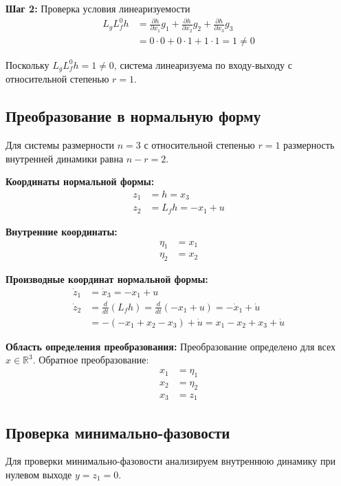 \textbf{Шаг 2:} Проверка условия линеаризуемости
\begin{align}
L_g L_f^0 h &= \frac{\partial h}{\partial x_1} g_1 + \frac{\partial h}{\partial x_2} g_2 + \frac{\partial h}{\partial x_3} g_3 \\
&= 0 \cdot 0 + 0 \cdot 1 + 1 \cdot 1 = 1 \neq 0
\end{align}

Поскольку $L_g L_f^0 h = 1 \neq 0$, система линеаризуема по входу-выходу с относительной степенью $r = 1$.

\subsection{Преобразование в нормальную форму}

Для системы размерности $n = 3$ с относительной степенью $r = 1$ размерность внутренней динамики равна $n - r = 2$.

\textbf{Координаты нормальной формы:}
\begin{align}
z_1 &= h = x_3 \\
z_2 &= L_f h = -x_1 + u
\end{align}

\textbf{Внутренние координаты:}
\begin{align}
\eta_1 &= x_1 \\
\eta_2 &= x_2
\end{align}

\textbf{Производные координат нормальной формы:}
\begin{align}
\dot{z}_1 &= \dot{x}_3 = -x_1 + u \\
\dot{z}_2 &= \frac{d}{dt}(L_f h) = \frac{d}{dt}(-x_1 + u) = -\dot{x}_1 + \dot{u} \\
&= -(-x_1 + x_2 - x_3) + \dot{u} = x_1 - x_2 + x_3 + \dot{u}
\end{align}

\textbf{Область определения преобразования:}
Преобразование определено для всех $x \in \mathbb{R}^3$. Обратное преобразование:
\begin{align}
x_1 &= \eta_1 \\
x_2 &= \eta_2 \\
x_3 &= z_1
\end{align}

\subsection{Проверка минимально-фазовости}

Для проверки минимально-фазовости анализируем внутреннюю динамику при нулевом выходе $y = z_1 = 0$.

